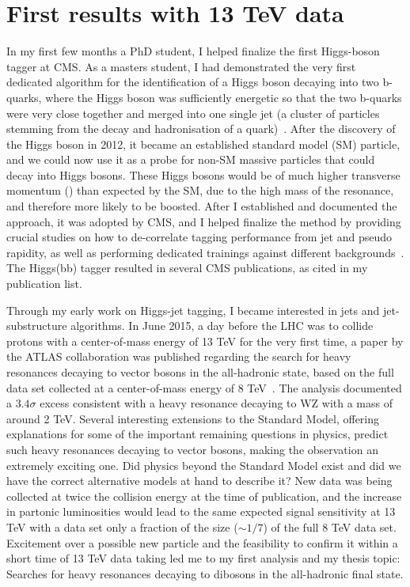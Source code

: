 \documentclass{pasa}%
\begin{document}
\section{First results with 13 TeV data}
\label{sec:yearI}
In my first few months a PhD student, I helped finalize the first Higgs-boson tagger at CMS. As a masters student, I had demonstrated the very first dedicated algorithm for the identification of a Higgs boson decaying into two b-quarks, where the Higgs boson was sufficiently energetic so that the two b-quarks were very close together and merged into one single jet (a cluster of particles stemming from the decay and hadronisation of a quark)~\cite{masterThesis}. After the discovery of the Higgs boson in 2012, it became an established standard model (SM) particle, and we could now use it as a probe for non-SM massive particles that could decay into Higgs bosons. These Higgs bosons would be of much higher transverse momentum (\PT) than expected by the SM, due to the high mass of the resonance, and therefore more likely to be boosted. After I established and documented the approach, it was adopted by CMS, and I helped finalize the method by providing crucial studies on how to de-correlate tagging performance from jet \PT and pseudo rapidity, as well as performing dedicated trainings against different backgrounds~\cite{CMS-PAS-BTV-15-002}. The Higgs(bb) tagger resulted in several CMS publications, as cited in my publication list.

Through my early work on Higgs-jet tagging, I became interested in jets and jet-substructure algorithms. In June 2015, a day before the LHC was to collide protons with a center-of-mass energy of 13 TeV for the very first time, a paper by the ATLAS collaboration was published regarding the search for heavy resonances decaying to vector bosons in the all-hadronic state, based on the full data set collected at a center-of-mass energy of 8 TeV~\cite{Aad2015}. The analysis documented a $3.4\sigma$ excess consistent with a heavy resonance decaying to WZ with a mass of around 2 TeV. Several interesting extensions to the Standard Model, offering explanations for some of the important remaining questions in physics, predict such heavy resonances decaying to vector bosons, making the observation an extremely exciting one. Did physics beyond the Standard Model exist and did we have the correct alternative models at hand to describe it? New data was being collected at twice the collision energy at the time of publication, and the increase in partonic luminosities would lead to the same expected signal sensitivity at 13 TeV with a data set only a fraction of the size ($\sim 1/7$) of the full 8 TeV data set. Excitement over a possible new particle and the feasibility to confirm it within a short time of 13 TeV data taking led me to my first analysis and my thesis topic: Searches for heavy resonances decaying to dibosons in the all-hadronic final state.
\end{document}
